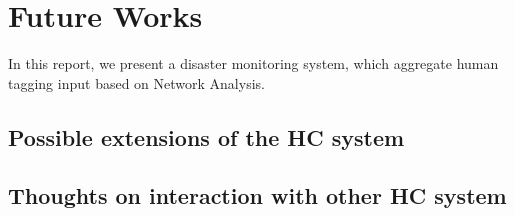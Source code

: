 \section{Future Works}

In this report, we present a disaster monitoring system, which aggregate human tagging input based on
Network Analysis. 

\subsection{Possible extensions of the HC system}
\subsection{Thoughts on interaction with other HC system}